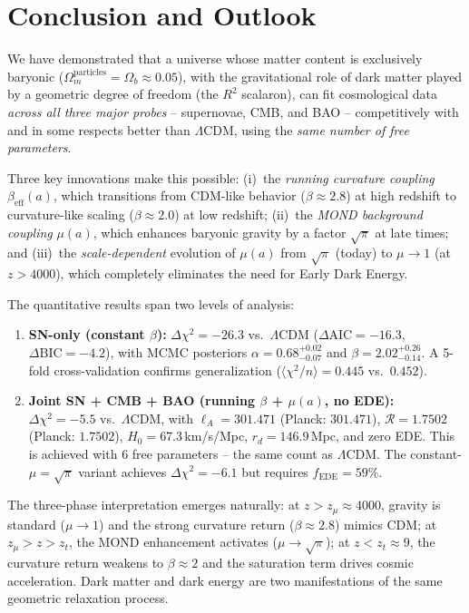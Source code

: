 \documentclass[aps,prd,twocolumn,superscriptaddress,nofootinbib]{revtex4-2}
\begin{document}
\section{Conclusion and Outlook}
\label{sec:conclusion}

We have demonstrated that a universe whose matter content is exclusively baryonic ($\Omega_m^{\mathrm{particles}} = \Omega_b \approx 0.05$), with the gravitational role of dark matter played by a geometric degree of freedom (the $R^2$ scalaron), can fit cosmological data \textit{across all three major probes} -- supernovae, CMB, and BAO -- competitively with and in some respects better than $\Lambda$CDM, using the \textit{same number of free parameters}.

Three key innovations make this possible: (i)~the \textit{running curvature coupling} $\beta_{\mathrm{eff}}(a)$, which transitions from CDM-like behavior ($\beta \approx 2.8$) at high redshift to curvature-like scaling ($\beta \approx 2.0$) at low redshift; (ii)~the \textit{MOND background coupling} $\mu(a)$, which enhances baryonic gravity by a factor $\sqrt{\pi}$ at late times; and (iii)~the \textit{scale-dependent} evolution of $\mu(a)$ from $\sqrt{\pi}$ (today) to $\mu \to 1$ (at $z > 4000$), which completely eliminates the need for Early Dark Energy.

The quantitative results span two levels of analysis:
\begin{enumerate}
\item \textbf{SN-only (constant $\beta$):} $\Delta\chi^2 = -26.3$ vs.\ $\Lambda$CDM ($\Delta\mathrm{AIC} = -16.3$, $\Delta\mathrm{BIC} = -4.2$), with MCMC posteriors $\alpha = 0.68^{+0.02}_{-0.07}$ and $\beta = 2.02^{+0.26}_{-0.14}$. A 5-fold cross-validation confirms generalization ($\langle\chi^2/n\rangle = 0.445$ vs.\ $0.452$).

\item \textbf{Joint SN + CMB + BAO (running $\beta$ + $\mu(a)$, no EDE):} $\Delta\chi^2 = -5.5$ vs.\ $\Lambda$CDM, with $\ell_A = 301.471$ (Planck: $301.471$), $\mathcal{R} = 1.7502$ (Planck: $1.7502$), $H_0 = 67.3$\,km/s/Mpc, $r_d = 146.9$\,Mpc, and zero EDE. This is achieved with 6 free parameters -- the same count as $\Lambda$CDM. The constant-$\mu = \sqrt{\pi}$ variant achieves $\Delta\chi^2 = -6.1$ but requires $f_{\mathrm{EDE}} = 59\%$.
\end{enumerate}

The three-phase interpretation emerges naturally: at $z > z_\mu \approx 4000$, gravity is standard ($\mu \to 1$) and the strong curvature return ($\beta \approx 2.8$) mimics CDM; at $z_\mu > z > z_t$, the MOND enhancement activates ($\mu \to \sqrt{\pi}$); at $z < z_t \approx 9$, the curvature return weakens to $\beta \approx 2$ and the saturation term drives cosmic acceleration. Dark matter and dark energy are two manifestations of the same geometric relaxation process.
\end{document}
